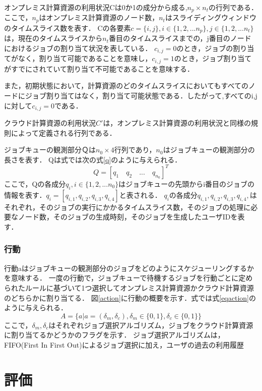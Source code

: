 \documentclass[12pt,oneside]{ise-thesis} %
\begin{document}
オンプレミス計算資源の利用状況Cは0か1の成分から成る,$n_p \times n_t$の行列である．
ここで，$n_p$はオンプレミス計算資源のノード数，$n_t$はスライディングウィンドウのタイムスライス数を表す．
Cの各要素$c=\{i,j\},i \in \{1,2,...n_p\},j \in \{1,2,...n_t\}$は，現在のタイムスライスから$n_t$番目のタイムスライスまでの，j番目のノードにおけるジョブの割り当て状況を表している．
$c_{i,j}=0$のとき，ジョブの割り当てがなく，割り当て可能であることを意味し，$c_{i,j}=1$のとき，ジョブ割り当てがすでにされていて割り当て不可能であることを意味する．

また，初期状態において，計算資源のどのタイムスライスにおいてもすべてのノードにジョブ割り当てはなく，割り当て可能状態である．したがって,すべてのi,jに対して$c_{i,j}=0$である．

クラウド計算資源の利用状況$C'$は，オンプレミス計算資源の利用状況と同様の規則によって定義される行列である．

ジョブキューの観測部分Ｑは$n_0\times 4$行列であり，$n_0$はジョブキューの観測部分の長さを表す．
Qは式では次の式\ref{q}のように与えられる．
\begin{equation}
\label{q}
    Q=[q_1 \quad q_2 \quad ... \quad q_{n_0}]^T
\end{equation}
ここで，Qの各成分$q_i,i \in \{1,2,...n_0\}$はジョブキューの先頭からi番目のジョブの情報を表す．$q_i=[q_{i,1},q_{i,2},q_{i,3},q_{i,4}]$と表される．
$q_i$の各成分$q_{i,1},q_{i,2},q_{i,3},q_{i,4},$はそれぞれ，そのジョブの実行にかかるタイムスライス数，そのジョブの処理に必要なノード数，そのジョブの生成時刻，そのジョブを生成したユーザIDを表す．

\subsection{行動}
行動aはジョブキューの観測部分のジョブをどのようにスケジューリングするかを意味する．
一度の行動で，ジョブキューで待機するジョブを行動ごとに定められたルールに基づいて1つ選択してオンプレミス計算資源かクラウド計算資源のどちらかに割り当てる．
図\ref{action}に行動の概要を示す．式では式\ref{eqaction}のように与えられる．
\begin{equation}
    A=\{a|a=(\delta_m,\delta_c),\delta_m \in \{0,1\},\delta_c \in \{0,1\}\}
\end{equation}
ここで，$\delta_m,\delta_c$はそれぞれジョブ選択アルゴリズム，ジョブをクラウド計算資源に割り当てるかどうかのフラグを示す．
ジョブ選択アルゴリズムは，FIFO(First In First Out)によるジョブ選択に加え，ユーザの過去の利用履歴


\chapter{評価}
\end{document}
